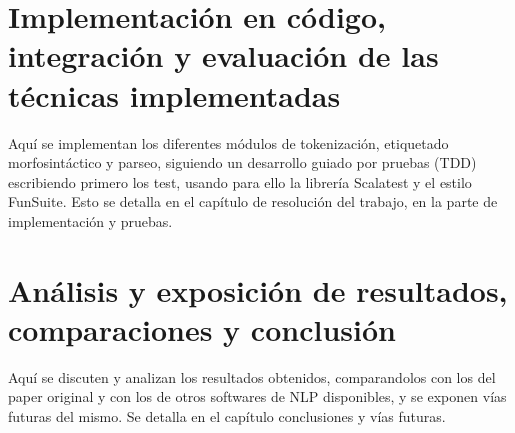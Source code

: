 \section{Implementación en código, integración y evaluación de las técnicas implementadas}
Aquí se implementan los diferentes módulos de tokenización, etiquetado morfosintáctico y parseo, siguiendo un desarrollo guiado por pruebas (TDD) escribiendo primero los test, usando para ello la librería Scalatest y el estilo FunSuite. Esto se detalla en el capítulo de resolución del trabajo, en la parte de implementación y pruebas. 

\section{Análisis y exposición de resultados, comparaciones y conclusión}   
Aquí se discuten y analizan los resultados obtenidos, comparandolos con los del paper original y con los de otros softwares de NLP disponibles, y se exponen vías futuras del mismo. Se detalla en el capítulo conclusiones y vías futuras.


